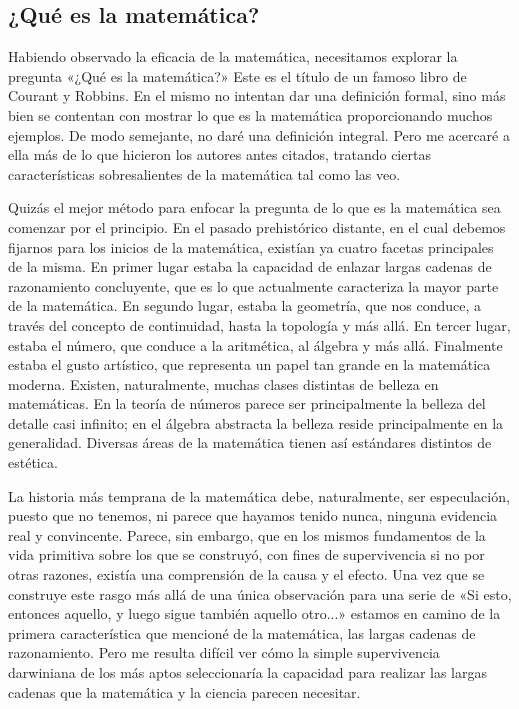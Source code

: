 \documentclass[a4paper, 12pt]{article}
\begin{document}
 

\subsection*{¿Qué es la matemática?}

 Habiendo observado la eficacia de la matemática, necesitamos explorar la pregunta «¿Qué es la matemática?» Este es el título de un famoso libro de Courant y Robbins. En el mismo no intentan dar una definición formal, sino más bien se contentan con mostrar lo que es la matemática proporcionando muchos ejemplos. De modo semejante, no daré una definición integral. Pero me acercaré a ella más de lo que hicieron los autores antes citados, tratando ciertas características sobresalientes de la matemática tal como las veo.

 

Quizás el mejor método para enfocar la pregunta de lo que es la matemática sea comenzar por el principio. En el pasado prehistórico distante, en el cual debemos fijarnos para los inicios de la matemática, existían ya cuatro facetas principales de la misma. En primer lugar estaba la capacidad de enlazar largas cadenas de razonamiento concluyente, que es lo que actualmente caracteriza la mayor parte de la matemática. En segundo lugar, estaba la geometría, que nos conduce, a través del concepto de continuidad, hasta la topología y más allá. En tercer lugar, estaba el número, que conduce a la aritmética, al álgebra y más allá. Finalmente estaba el gusto artístico, que representa un papel tan grande en la matemática moderna. Existen, naturalmente, muchas clases distintas de belleza en matemáticas. En la teoría de números parece ser principalmente la belleza del detalle casi infinito; en el álgebra abstracta la belleza reside principalmente en la generalidad. Diversas áreas de la matemática tienen así estándares distintos de estética.

 

La historia más temprana de la matemática debe, naturalmente, ser especulación, puesto que no tenemos, ni parece que hayamos tenido nunca, ninguna evidencia real y convincente. Parece, sin embargo, que en los mismos fundamentos de la vida primitiva sobre los que se construyó, con fines de supervivencia si no por otras razones, existía una comprensión de la causa y el efecto. Una vez que se construye este rasgo más allá de una única observación para una serie de «Si esto, entonces aquello, y luego sigue también aquello otro...» estamos en camino de la primera característica que mencioné de la matemática, las largas cadenas de razonamiento. Pero me resulta difícil ver cómo la simple supervivencia darwiniana de los más aptos seleccionaría la capacidad  
para realizar las largas cadenas que la matemática y la ciencia parecen necesitar.
\end{document}
